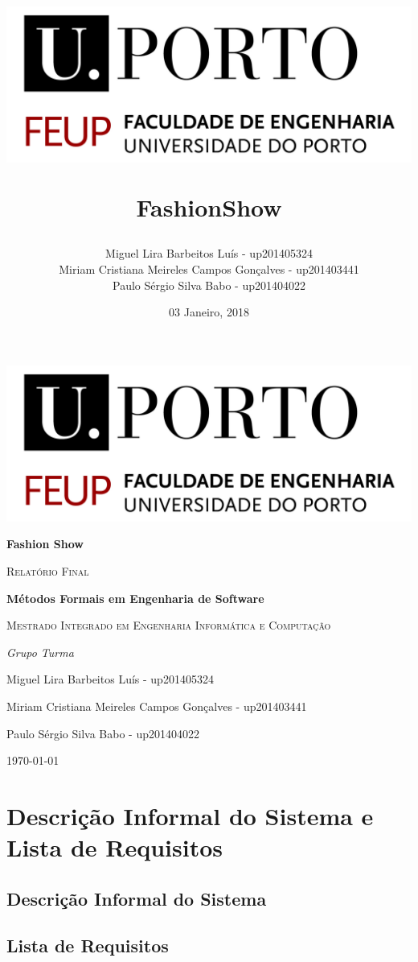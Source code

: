 \documentclass{article}
\title{ \begin{center}
					\includegraphics[scale=0.6]{./images/FEUPlogo}
				\end{center}
				\textbf{FashionShow}}
\author{Miguel Lira Barbeitos Luís - up201405324\\
		Miriam Cristiana Meireles Campos Gonçalves - up201403441\\
		Paulo Sérgio Silva Babo - up201404022}
\date{03 Janeiro, 2018}
\begin{document}
\begin{titlepage}
	\centering
	\includegraphics[width=1\textwidth]{./images/FEUPlogo}\par\vspace{1cm}
	{\huge\bfseries Fashion Show \par}
	\vspace{2cm}
	{\scshape\Large Relatório Final\par}
	\vspace{1.5cm}
	{\large\bfseries Métodos Formais em Engenharia de Software\par}
	\vspace{0.7cm}
	{\scshape\normalsize  Mestrado Integrado em Engenharia Informática e Computação \par}
	\vspace{1.5cm}
	{\Large\itshape Grupo Turma 
	\par Miguel Lira Barbeitos Luís - up201405324 \par
	Miriam Cristiana Meireles Campos Gonçalves - up201403441 \par
	Paulo Sérgio Silva Babo - up201404022\par}

	\vfill
	{\large \today\par}
\end{titlepage}
\thispagestyle{empty}

\newpage

\tableofcontents

\newpage

\section{Descrição Informal do Sistema e Lista de Requisitos}
\subsection{Descrição Informal do Sistema}
\subsection{Lista de Requisitos}
\end{document}
